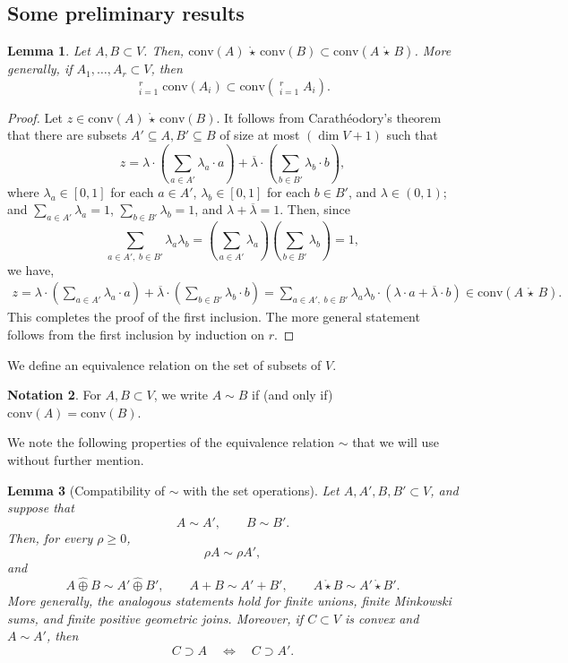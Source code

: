 \documentclass[10pt]{amsart}
\theoremstyle{plain}
\newtheorem{lemma}{Lemma}[section]
\theoremstyle{definition}
\newtheorem{notation}[lemma]{Notation}
\providecommand{\caratheodory}[0]{Carath\'{e}odory\xspace}
\let\geq\geqslant
\providecommand{\cmult}[0]{\ensuremath{{\,\mathring{\star}\,}}\xspace}
\providecommand{\Cmult}[0]{\ensuremath{\mathop{\mathring{\bigstar}}}\xspace}
\providecommand{\conv}[1]{\ensuremath{\mathrm{conv}{\left({#1}\right)}\xspace}}
\begin{document}
\subsection{Some preliminary results}
\label{subsec:preliminary}

\begin{lemma}
\label{lem:convOfconvo-contains-convoOfconv}
    Let $A,B\subset V$. Then, $\conv{A}\cmult\conv{B}\subset \conv{A\cmult B}$.
    More generally, if $A_1,\ldots,A_r \subset V$, then 
    \[
    \Cmult_{i=1}^r \conv{A_i} \subset \conv{\Cmult_{i=1}^r A_i}. 
    \]
\end{lemma}
\begin{proof}
Let $z\in\conv{A}\cmult \conv{B}$. It follows from \caratheodory's theorem that there are subsets $A'\subseteq A,B'\subseteq B$ of size at most $(\dim V +1)$ such that $$z=\lambda\cdot\left(\sum_{a\in A'}\lambda_a\cdot a\right) + \overline\lambda\cdot \left(\sum_{b\in B'}\lambda_b\cdot b\right),$$
where $\lambda_a\in [0,1]$ for each $a\in A'$, $\lambda_b\in [0,1]$ for each $b\in B'$, and $\lambda\in (0,1)$; and $\sum_{a\in A'}\lambda_a=1$, $\sum_{b\in B'}\lambda_b=1$, and $\lambda+\overline{\lambda}=1$. Then, since $$\sum_{a\in A', \; b\in B'} \lambda_a\lambda_b=\left(\sum_{a\in A'}\lambda_a\right)\left(\sum_{b\in B'}\lambda_b\right)=1,$$
we have,
\begin{align*}
    z=\lambda\cdot\left(\sum_{a\in A'}\lambda_a\cdot a\right) + \overline\lambda\cdot \left(\sum_{b\in B'}\lambda_b\cdot b\right)=\sum_{a\in A', \; b\in B'} \lambda_a\lambda_b \cdot\left(\lambda\cdot a +\overline\lambda \cdot b\right) \in \conv{A\cmult B}.
\end{align*}
This completes the proof of the first inclusion. The more general statement follows from the first inclusion by induction on $r$. 
\end{proof}

We define an equivalence relation on the set of subsets of $V$.
\begin{notation}
\label{not:sim}
For $A,B\subset V$, 
we write  $A\sim B$  if (and only if) $\conv A=\conv B$. 
\end{notation}
We note the following properties of the equivalence relation $\sim$ that we will use without further mention.

\begin{lemma}[Compatibility of \(\sim\) with the set operations]
\label{lem:compatiblity}
Let \(A,A',B,B'\subset V\), and suppose that
\[
A\sim A',
\qquad
B\sim B'.
\]
Then, for every \(\rho\geq 0\),
\[
\rho A\sim \rho A',
\]
and
\[
A\widehat\oplus B
\sim
A'\widehat\oplus B',
\qquad
A+B\sim A'+B',
\qquad
A\mathring\star B
\sim
A'\mathring\star B'.
\]
More generally, the analogous statements hold for finite unions,
finite Minkowski sums, and finite positive geometric joins.
Moreover, if \(C\subset V\) is convex and \(A\sim A'\), then
\[
C\supset A
\quad\Longleftrightarrow\quad
C\supset A'.
\]
\end{lemma}
\end{document}
